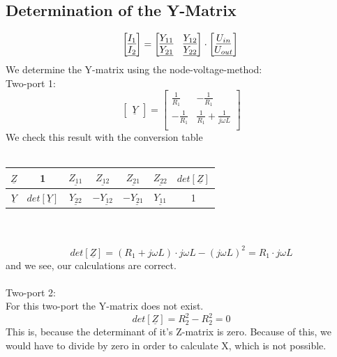 \documentclass[a4paper]{article}
\begin{document}
\subsection{Determination of the Y-Matrix}

\begin{equation*}
	\begin{bmatrix}
		\underline{I_1}\\ \underline{I_2}\\
	\end{bmatrix} =
	\begin{bmatrix}
		\underline{Y_{11}} & \underline{Y_{12}}\\
		\underline{Y_{21}} & \underline{Y_{22}}\\
	\end{bmatrix} \cdot
	\begin{bmatrix}
		\underline{U_{in}}\\ \underline{U_{out}}\\
	\end{bmatrix}\\
\end{equation*}
We determine the Y-matrix using the node-voltage-method:\\
Two-port 1:
\begin{equation*}
	\begin{bmatrix}
		\underline{Y}
	\end{bmatrix}=
	\begin{bmatrix}
		\frac{1}{R_1} & -\frac{1}{R_1}\\
		-\frac{1}{R_1} & \frac{1}{R_1} + \frac{1}{j\omega L}\\
	\end{bmatrix}
\end{equation*}
We check this result with the conversion table\\\\
\begin{tabular}{c|c|c|c|c|c|c}
	$\underline{Z}$ & 1 & $\underline{Z_{11}}$ & $\underline{Z_{12}}$ & $\underline{Z_{21}}$ & $\underline{Z_{22}}$ & $det[\underline{Z}]$\\[1ex]
	\hline 
	$\underline{Y}$ & $det[\underline{Y}]$ & $\underline{Y_{22}}$ & $-\underline{Y_{12}}$ & $-\underline{Y_{21}}$ & $\underline{Y_{11}}$ & 1\\[1ex]
\end{tabular}\\\\

\begin{equation*}
	det[\underline{Z}] = (R_1 + j\omega L) \cdot j\omega L - (j\omega L)^2 = R_1 \cdot j\omega L
\end{equation*}
and we see, our calculations are correct.\\
\\
Two-port 2:\\
For this two-port the Y-matrix does not exist.
\begin{equation*}
	det[\underline{Z}] = R_2^2 - R_2^2 = 0
\end{equation*}
This is, because the determinant of it's Z-matrix is zero.
Because of this, we would have to divide by zero in order to calculate X, which is not possible.
\end{document}
